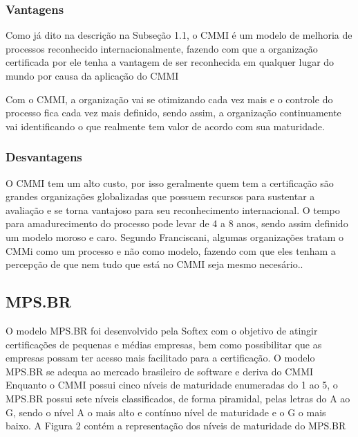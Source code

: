 \subsubsection{Vantagens}

  Como já dito na descrição na Subseção 1.1, o CMMI é um modelo de melhoria
  de processos reconhecido internacionalmente, fazendo com que a organização
  certificada por ele tenha a vantagem de ser reconhecida em qualquer lugar
  do mundo por causa da aplicação do CMMI

  Com o CMMI, a organização vai se otimizando cada vez mais e o controle do
  processo fica cada vez mais definido, sendo assim, a organização continuamente
  vai identificando o que realmente tem valor de acordo com sua maturidade.

\subsubsection{Desvantagens}

  O CMMI tem um alto custo, por isso geralmente quem tem a certificação são
  grandes organizações globalizadas que possuem recursos para sustentar a
  avaliação e se torna vantajoso para seu reconhecimento internacional. O
  tempo para amadurecimento do processo pode levar de 4 a 8 anos, sendo assim
  definido um modelo moroso e caro. Segundo Franciscani, algumas organizações
  tratam o CMMi como um processo e não como modelo, fazendo com que eles tenham
  a percepção de que nem tudo que está no CMMI seja mesmo necesário.\cite{francis2012}.

\subsection{MPS.BR}

  O modelo MPS.BR foi desenvolvido pela Softex com o objetivo de atingir
  certificações de pequenas e médias empresas, bem como possibilitar que
  as empresas possam ter acesso mais facilitado para a certificação.
  O modelo MPS.BR se adequa ao mercado brasileiro de software e deriva do CMMI
  Enquanto o CMMI possui cinco níveis de maturidade enumeradas do 1 ao 5, o
  MPS.BR possui sete níveis classificados, de forma piramidal,  pelas letras
  do A ao G, sendo o nível A o mais alto e contínuo nível de maturidade e o G
  o mais baixo. A Figura 2 contém a representação dos níveis de maturidade do
  MPS.BR

